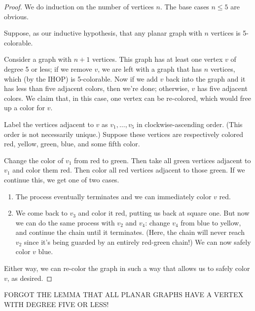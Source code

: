 \documentclass[../m55main.tex]{chapters}
\begin{document}
\begin{proof}
    We do induction on the number of vertices $n$.
    The base cases $n \leq 5$ are obvious.

    Suppose, as our inductive hypothesis, that any planar graph with $n$ vertices is 5-colorable.

    Consider a graph with $n+1$ vertices.
    This graph has at least one vertex $v$ of degree 5 or less; if we remove $v$, we are left with a graph that has $n$ vertices, which (by the IHOP) is 5-colorable.
    Now if we add $v$ back into the graph and it has less than five adjacent colors, then we're done; otherwise, $v$ has five adjacent colors.
    We claim that, in this case, one vertex can be re-colored, which would free up a color for $v$.

    Label the vertices adjacent to $v$ as $v_1, \ldots, v_5$ in clockwise-ascending order.
    (This order is not necessarily unique.)
    Suppose these vertices are respectively colored red, yellow, green, blue, and some fifth color.

    Change the color of $v_1$ from red to green.
    Then take all green vertices adjacent to $v_1$ and color them red.
    Then color all red vertices adjacent to those green.
    If we continue this, we get one of two cases.
    \begin{enumerate}[label=(\alph*)]
        \item The process eventually terminates and we can immediately color $v$ red.
        \item We come back to $v_3$ and color it red, putting us back at square one.
        But now we can do the same process with $v_2$ and $v_4$: change $v_4$ from blue to yellow, and continue the chain until it terminates.
        (Here, the chain will never reach $v_2$ since it's being guarded by an entirely red-green chain!)
        We can now safely color $v$ blue.
    \end{enumerate}
    Either way, we can re-color the graph in such a way that allows us to safely color $v$, as desired.
\end{proof}

FORGOT THE LEMMA THAT ALL PLANAR GRAPHS HAVE A VERTEX WITH DEGREE FIVE OR LESS!
\end{document}
